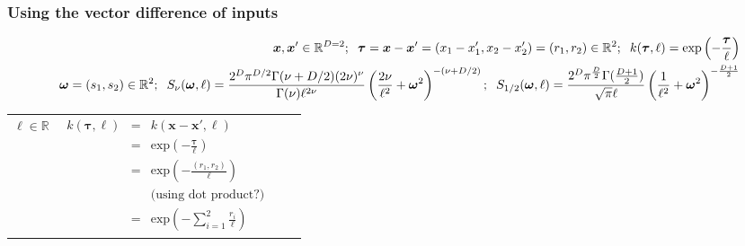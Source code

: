 \documentclass[onecolumn,a4paper,11pt]{article}
\begin{document}
\begin{landscape}
\begin{table}[H]
\begin{center}
\begin{tabular}{|c|c|c|c|}
       & \multicolumn{1}{|p{6.7cm}|}{\small

       } \\ 
       
       \hline
    \end{tabular}
  \end{center}
\end{table}


\newpage
\subsubsection{Using  the vector difference of inputs}
\vspace{-5mm}

\begin{table}[H]
\small
\begin{eqnarray*}
\vspace{-20mm}
&&\bm{x}, \bm{x}' \in \mathbb{R}^{D=2}; \hspace{2mm}\bm{\tau} =\bm{x}-\bm{x}' = (x_1-x_1',x_2-x_2') = (r_1,r_2) \in \mathbb{R}^2; \hspace{2mm} k(\bm{\tau},\ell) = \mathrm{exp}\left(- \frac{\bm{\tau}}{\ell} \right)\\
&& \bm{\omega}= (s_1,s_2) \in \mathbb{R}^2; \hspace{2mm}S_{\nu}(\bm{\omega},\ell) = \frac{2^D\pi^{D/2}\Gamma(\nu+D/2)(2\nu)^{\nu}}{\Gamma(\nu)\ell^{2\nu}}\left(\frac{2\nu}{\ell^2}+\bm{\omega}^2 \right)^{-(\nu+D/2)}; \hspace{2mm} S_{1/2}(\bm{\omega},\ell) = \frac{2^D\pi^{\frac{D}{2}}\Gamma(\frac{D+1}{2})}{\sqrt{\pi}\ell}\left(\frac{1}{\ell^2}+\bm{\omega}^2 \right)^{-\frac{D+1}{2}}
\end{eqnarray*}
\normalsize
  \begin{center}
    \begin{tabular}{|c|c|c|c|}
       \hline
       
       \multicolumn{1}{|p{1.5cm}|}{
       \vspace{1mm}
       $\ell \in \mathbb{R}$
       }
       
        & \multicolumn{1}{|p{5.7cm}|}{\small
         \begin{eqnarray*}
		k(\bm{\tau},\ell) &=& k(\bm{x}-\bm{x}',\ell)\\
		 &=& \mathrm{exp}\left(- \frac{\bm{\tau}}{\ell} \right) \\
		&=& \mathrm{exp}\left(- \frac{(r_1, r_2)}{\ell} \right)\\
		&&\text{(using dot product?)}\\
		&=& \mathrm{exp}\left(- \sum_{i=1}^{2}\frac{r_i}{\ell} \right)
		\end{eqnarray*}
       }
       

\end{tabular}
\end{center}
\end{table}
\end{landscape}
\end{document}
